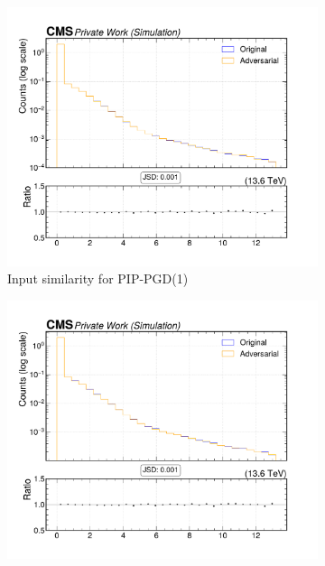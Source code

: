 \begin{figure}[htbp]
  \centering
  \begin{subfigure}[t]{0.32\textwidth}
    \includegraphics[width=\linewidth]{media/output/features/compare/combined_it_1/cmp_vtx_arr_sv_mass.pdf}
    \caption*{Input similarity for PIP-PGD(1)}
  \end{subfigure}\hfill
  \begin{subfigure}[t]{0.32\textwidth}
    \includegraphics[width=\linewidth]{media/output/features/compare/combined_it_2/cmp_vtx_arr_sv_mass.pdf}

\end{subfigure}
\end{figure}
